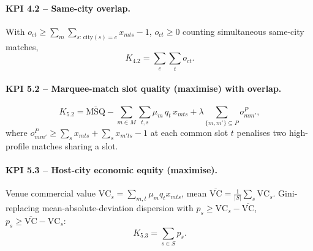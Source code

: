 \paragraph{KPI 4.2 -- Same-city overlap.}
With $o_{ct}\ge \sum_{m}\sum_{s:\,\mathrm{city}(s)=c} x_{mts}-1$,
$o_{ct}\ge 0$ counting simultaneous same-city matches,
\begin{equation}
  K_{4.2}=\sum_{c}\sum_{t} o_{ct}.
\end{equation}


\paragraph{KPI 5.2 -- Marquee-match slot quality (maximise) with overlap.}
\begin{equation}
  K_{5.2}=\overline{\mathrm{MSQ}}
          -\sum_{m\in M}\sum_{t,s}\mu_m\,q_t\,x_{mts}
          +\lambda\!\!\sum_{\{m,m'\}\subseteq P}\!\! o^P_{mm'},
\end{equation}
where $o^P_{mm'}\ge \sum_s x_{mts}+\sum_s x_{m'ts}-1$ at each common slot
$t$ penalises two high-profile matches sharing a slot.

\paragraph{KPI 5.3 -- Host-city economic equity (maximise).}
Venue commercial value $\mathrm{VC}_s=\sum_{m,t}\mu_m q_t x_{mts}$,
mean $\overline{\mathrm{VC}}=\tfrac1{|S|}\sum_s\mathrm{VC}_s$.
Gini-replacing mean-absolute-deviation dispersion with
$p_s\ge \mathrm{VC}_s-\overline{\mathrm{VC}}$,
$p_s\ge \overline{\mathrm{VC}}-\mathrm{VC}_s$:
\begin{equation}
  K_{5.3}=\sum_{s\in S} p_s .
\end{equation}

% 